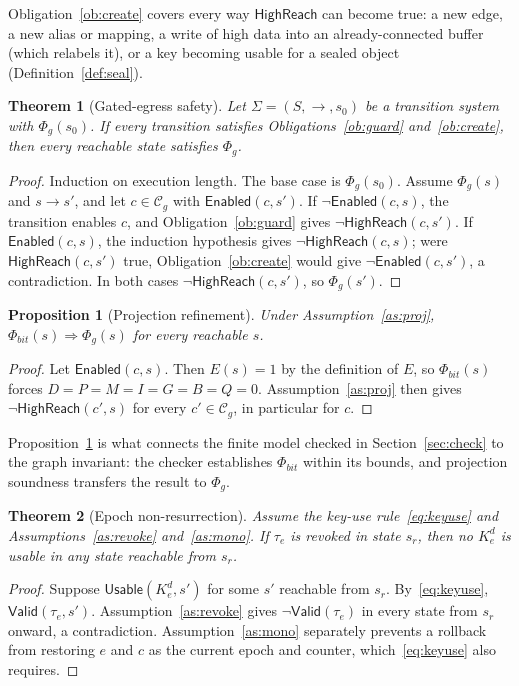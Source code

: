 \documentclass[11pt,letterpaper]{article}
\theoremstyle{plain}
\newtheorem{theorem}{Theorem}
\newtheorem{proposition}{Proposition}
\theoremstyle{definition}
\newcommand{\HR}{\mathsf{HighReach}}
\newcommand{\En}{\mathsf{Enabled}}
\newcommand{\Usable}{\mathsf{Usable}}
\newcommand{\Valid}{\mathsf{Valid}}
\newcommand{\Cg}{\mathcal{C}_g}
\begin{document}
Obligation~\ref{ob:create} covers every way $\HR$ can become true: a new edge, a new alias or mapping, a write of high data into an already-connected buffer (which relabels it), or a key becoming usable for a sealed object (Definition~\ref{def:seal}).

\begin{theorem}[Gated-egress safety]\label{thm:safety}
Let $\Sigma = (S, \to, s_0)$ be a transition system with $\Phi_g(s_0)$. If every transition satisfies Obligations~\ref{ob:guard} and~\ref{ob:create}, then every reachable state satisfies $\Phi_g$.
\end{theorem}
\begin{proof}
Induction on execution length. The base case is $\Phi_g(s_0)$. Assume $\Phi_g(s)$ and $s \to s'$, and let $c \in \Cg$ with $\En(c,s')$. If $\neg\En(c,s)$, the transition enables $c$, and Obligation~\ref{ob:guard} gives $\neg\HR(c,s')$. If $\En(c,s)$, the induction hypothesis gives $\neg\HR(c,s)$; were $\HR(c,s')$ true, Obligation~\ref{ob:create} would give $\neg\En(c,s')$, a contradiction. In both cases $\neg\HR(c,s')$, so $\Phi_g(s')$.
\end{proof}

\begin{proposition}[Projection refinement]\label{prop:proj}
Under Assumption~\ref{as:proj}, $\Phi_{bit}(s) \Rightarrow \Phi_g(s)$ for every reachable $s$.
\end{proposition}
\begin{proof}
Let $\En(c,s)$. Then $E(s) = 1$ by the definition of $E$, so $\Phi_{bit}(s)$ forces $D = P = M = I = G = B = Q = 0$. Assumption~\ref{as:proj} then gives $\neg\HR(c',s)$ for every $c' \in \Cg$, in particular for $c$.
\end{proof}

Proposition~\ref{prop:proj} is what connects the finite model checked in Section~\ref{sec:check} to the graph invariant: the checker establishes $\Phi_{bit}$ within its bounds, and projection soundness transfers the result to $\Phi_g$.

\begin{theorem}[Epoch non-resurrection]\label{thm:epoch}
Assume the key-use rule~\eqref{eq:keyuse} and Assumptions~\ref{as:revoke} and~\ref{as:mono}. If $\tau_e$ is revoked in state $s_r$, then no $K^{d}_{e}$ is usable in any state reachable from $s_r$.
\end{theorem}
\begin{proof}
Suppose $\Usable(K^{d}_{e}, s')$ for some $s'$ reachable from $s_r$. By~\eqref{eq:keyuse}, $\Valid(\tau_e, s')$. Assumption~\ref{as:revoke} gives $\neg\Valid(\tau_e)$ in every state from $s_r$ onward, a contradiction. Assumption~\ref{as:mono} separately prevents a rollback from restoring $e$ and $c$ as the current epoch and counter, which~\eqref{eq:keyuse} also requires.
\end{proof}
\end{document}
